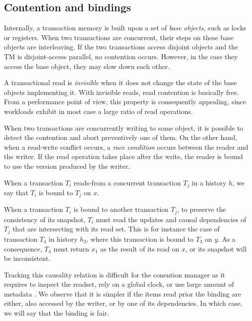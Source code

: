 \subsection{Contention and bindings}

Internally, a transaction memory is built upon a set of \emph{base objects}, such as locks or registers.
When two transactions are concurrent, their steps on these base objects are interleaving.
If the two transactions access disjoint objects and the TM is disjoint-access parallel, no contention occurs.
However, in the case they access the base object, they may slow down each other.

A transactional read is \emph{invisible} when it does not change the state of the base objects implementing it.
With invisible reads, read contention is basically free.
From a performance point of view, this property is consequently appealing, since workloads exhibit in most case a large ratio of read operations.

When two transactions are concurrently writing to some object, it is possible to detect the contention and abort preventively one of them.
On the other hand, when a read-write conflict occurs, a \emph{race condition} occurs between the reader and the writer.
If the read operation takes place after the write, the reader is bound to use the version produced by the writer.

\begin{definition}[Binding]
  When a transaction $T_i$ reads-from a concurrent transaction $T_j$ in a history $h$, we say that $T_i$ is bound to $T_j$ on $x$.
\end{definition}

When a transaction $T_i$ is bound to another transaction $T_j$, to preserve the consistency of its snapshot, $T_i$ must read the updates and causal dependencies of $T_j$ that are intersecting with its read set.
This is for instance the case of transaction $T_4$ in history $h_2$, where this transaction is bound to $T_3$ on $y$.
As a consequence, $T_4$ must return $x_1$ as the result of its read on $x$, or its snapshot will be inconsistent.

Tracking this causality relation is difficult for the conention manager as it requires to inspect the readset, rely on a global clock, or use large amount of metadata \cite{}.
We observe that it is simpler if the items read prior the binding are either, also accessed by the writer, or by one of its dependencies.
In which case, we will say that the binding is fair.

